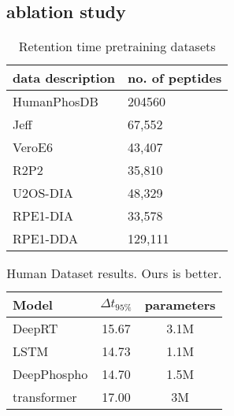 \subsection{ablation study}
%
%
%
%
%
%
%
%
%
%
%

\begin{table}
   \begin{center}
   \begin{tabularx}{\columnwidth}{|Y|Y|}
   \hline
   data description & no. of peptides \\
   \hline
   HumanPhosDB~\cite{lawrence2016plug} & 204560 \\
   Jeff~\cite{liu2018vivo} & 67,552 \\
   VeroE6~\cite{bouhaddou2020global} & 43,407  \\
   R2P2~\cite{leutert2019r2} & 35,810 \\
   U2OS-DIA~\cite{wang2020naguider} & 48,329\\
   RPE1-DIA~\cite{bekker2020rapid} & 33,578  \\
   RPE1-DDA~\cite{bekker2020rapid} & 129,111  \\
   \hline
   \end{tabularx}
   \end{center}
   \caption{Retention time pretraining datasets}
   \label{table:pretrained_Dataset}
   \end{table}

\begin{table}
   \begin{center}
   \begin{tabular}{|l|c|c|}
   \hline
   Model & $\Delta$$t_{95\%}$ & parameters \\
   \hline\hline
   DeepRT & 15.67 & 3.1M \\
   LSTM & 14.73 & 1.1M \\
   DeepPhospho & 14.70 & 1.5M \\
   transformer & 17.00 & 3M \\
   \hline
   \end{tabular}
   \end{center}
   \caption{Human Dataset results. Ours is better.}
   \label{table:Human}
   \end{table}


